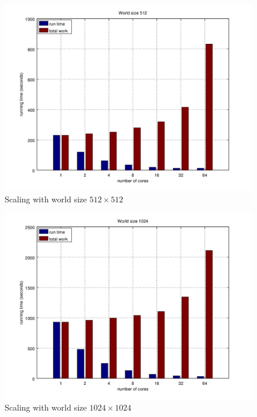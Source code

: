 \documentclass[a4paper]{article}
\begin{document}
\begin{figure}
    \centering
    \includegraphics[width=\textwidth]{scaling-512}
    \caption{Scaling with world size $512 \times 512$}
\end{figure}

\begin{figure}
    \centering
    \includegraphics[width=\textwidth]{scaling-1024}
    \caption{Scaling with world size $1024 \times 1024$}
\end{figure}
\end{document}
